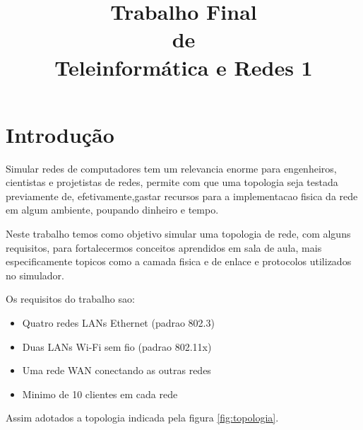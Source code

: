 \documentclass[conference]{IEEEtran}
\begin{document}
\title{Trabalho Final \\
	de \\
	Teleinformática e Redes 1}

\author{
\and
{}
\and
{}
}

\maketitle

\IEEEpeerreviewmaketitle

\section{Introdução}
	Simular redes de computadores tem um relevancia enorme para engenheiros, cientistas e projetistas de redes, permite com que uma topologia seja testada previamente de, efetivamente,gastar recursos para a implementacao fisica da rede em algum ambiente, poupando dinheiro e tempo.
	
	Neste trabalho temos como objetivo simular uma topologia de rede, com alguns requisitos, para fortalecermos conceitos aprendidos em sala de aula, mais especificamente topicos como a camada fisica e de enlace e protocolos utilizados no simulador.
	
	Os requisitos do trabalho sao:
	
	\begin{itemize}
		\item Quatro redes LANs Ethernet (padrao 802.3) 
		\item Duas LANs Wi-Fi sem fio (padrao 802.11x)
		\item Uma rede WAN conectando as outras redes
		\item Minimo de 10 clientes em cada rede
	\end{itemize}

	Assim adotados a topologia indicada pela figura \ref{fig:topologia}.
	
\end{document}
